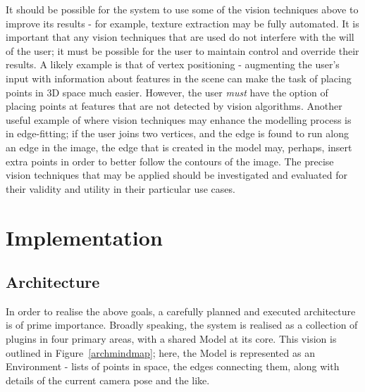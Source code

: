 \documentclass[a4paper,10pt]{report}
\begin{document}
It should be possible for the system to use some of the vision techniques above to improve its results - for example, texture extraction may be fully automated. It is important that any vision techniques that are used do not interfere with the will of the user; it must be possible for the user to maintain control and override their results. A likely example is that of vertex positioning - augmenting the user's input with information about features in the scene can make the task of placing points in 3D space much easier. However, the user \textit{must} have the option of placing points at features that are not detected by vision algorithms. Another useful example of where vision techniques may enhance the modelling process is in edge-fitting; if the user joins two vertices, and the edge is found to run along an edge in the image, the edge that is created in the model may, perhaps, insert extra points in order to better follow the contours of the image. The precise vision techniques that may be applied should be investigated and evaluated for their validity and utility in their particular use cases.

\clearpage

\chapter{Implementation}
\section{Architecture}
In order to realise the above goals, a carefully planned and executed architecture is of prime importance. Broadly speaking, the system is realised as a collection of plugins in four primary areas, with a shared Model at its core. This vision is outlined in Figure~\ref{archmindmap}; here, the Model is represented as an Environment - lists of points in space, the edges connecting them, along with details of the current camera pose and the like.
\end{document}
